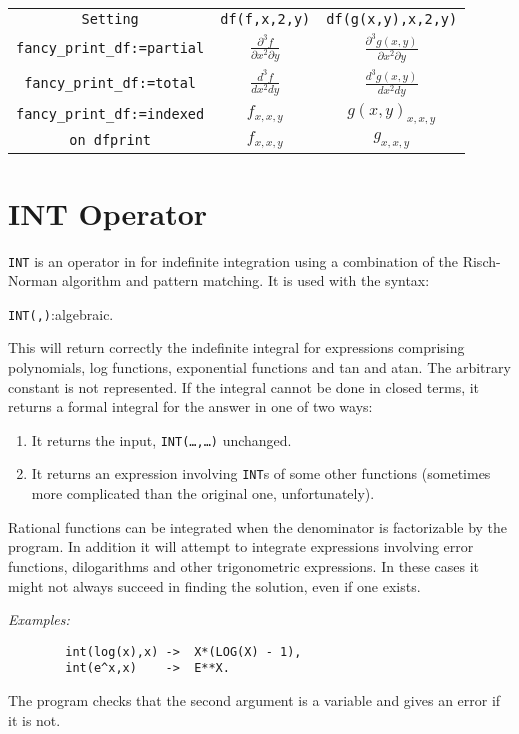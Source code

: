 \begin{tabular}{ccc}
  \texttt{Setting} & \texttt{df(f,x,2,y)} & \texttt{df(g(x,y),x,2,y)} \\
  \texttt{fancy\_print\_df:=partial} &
  \(\frac{\partial^3 f}{\partial x^2 \partial y}\) &
  \(\frac{\partial^3 g(x,y)}{\partial x^2 \partial y}\) \\
  \texttt{fancy\_print\_df:=total} & \(\frac{d^3 f}{d x^2 d y}\) &
  \(\frac{d^3 g(x,y)}{d x^2 d y}\) \\
  \texttt{fancy\_print\_df:=indexed} & \(f_{x,x,y}\) & \(g(x,y)_{x,x,y}\) \\
  \texttt{on dfprint} & \(f_{x,x,y}\) & \(g_{x,x,y}\)
\end{tabular}

\section{INT Operator}
\hypertarget{operator:INT}{}
\texttt{INT} is an operator in {\REDUCE} for indefinite
integration using a
combination of the Risch-Norman algorithm and pattern matching.  It is
used with the syntax:
\begin{syntax}
   \texttt{INT(}\texttt{,}\texttt{)}:algebraic.
\end{syntax}
This will return correctly the indefinite integral for expressions comprising
polynomials, log functions, exponential functions and tan and atan. The
arbitrary constant is not represented. If the integral cannot be done in
closed terms, it returns a formal integral for the answer in one of two ways:
\begin{enumerate}
\item It returns the input, \texttt{INT(\ldots,\ldots)} unchanged.

\item It returns an expression involving \texttt{INT}s of some
      other functions (sometimes more complicated than
      the original one, unfortunately).
\end{enumerate}
Rational functions can be integrated when the denominator is factorizable
by the program. In addition it will attempt to integrate expressions
involving error functions, dilogarithms and other trigonometric
expressions. In these cases it might not always succeed in finding the
solution, even if one exists.

\textit{Examples:}
\begin{verbatim}
        int(log(x),x) ->  X*(LOG(X) - 1),
        int(e^x,x)    ->  E**X.
\end{verbatim}
The program checks that the second argument is a variable and gives an
error if it is not.

